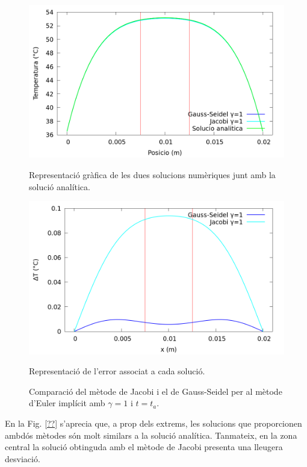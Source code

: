 \documentclass[11pt]{article}
\begin{document}
\begin{figure}[htbp]
    \centering
    \begin{minipage}{0.45\textwidth}
        \centering
        \includegraphics[width=\linewidth]{Implicit_N/implicit_grafica_comparacio.png}
        \caption{Representació gràfica de les dues solucions numèriques junt amb la solució analítica.}
        \label{fig: compar jacobi gs}
    \end{minipage}\hfill
    \begin{minipage}{0.45\textwidth}
        \centering
        \includegraphics[width=\linewidth]{Implicit_N/error_implicit_comparacio.png}
        \caption{Representació de l'error associat a cada solució.}
        \label{fig: error compar jacobi gs}
    \end{minipage}
    \caption{Comparació del mètode de Jacobi i el de Gauss-Seidel per al mètode d'Euler implícit amb $\gamma=1$ i $t=t_a$.}
    \label{fig: comparacio jacobi i gs}
\end{figure}

En la Fig. \ref{??} s'aprecia que, a prop dels extrems, les solucions que proporcionen ambdós mètodes són molt similars a la solució analítica. Tanmateix, en la zona central la solució obtinguda amb el mètode de Jacobi presenta una lleugera desviació.
\end{document}
